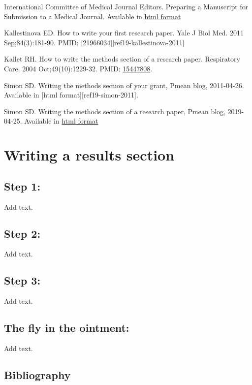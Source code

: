 \documentclass[
  letterpaper,
  DIV=11,
  numbers=noendperiod]{scrreprt}
\begin{document}
International Committee of Medical Journal Editors. Preparing a
Manuscript for Submission to a Medical Journal. Available in
\href{https://icmje.org/recommendations/browse/manuscript-preparation/preparing-for-submission.html}{html
format}

Kallestinova ED. How to write your first research paper. Yale J Biol
Med. 2011 Sep;84(3):181-90. PMID:
{[}21966034{]}{[}ref19-kallestinova-2011{]}

Kallet RH. How to write the methods section of a research paper.
Respiratory Care. 2004 Oct;49(10):1229-32. PMID:
\href{https://pubmed.ncbi.nlm.nih.gov/15447808/}{15447808}.

Simon SD. Writing the methods section of your grant, Pmean blog,
2011-04-26. Available in {[}html format{]}{[}ref19-simon-2011{]}.

Simon SD. Writing the methods section of a research paper, Pmean blog,
2019-04-25. Available in
\href{http://pmean.com/posts/writing-methods-section/}{html format}


\chapter{Writing a results section}\label{writing-a-results-section}

\section{Step 1:}\label{step-1}

Add text.

\section{Step 2:}\label{step-2}

Add text.

\section{Step 3:}\label{step-3}

Add text.

\section{The fly in the ointment:}\label{the-fly-in-the-ointment-5}

Add text.

\section{Bibliography}\label{bibliography-7}
\end{document}

